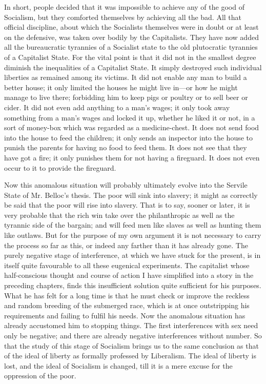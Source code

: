 \documentclass{book}
\begin{document}
In short, people decided that it was impossible to achieve any of the good of Socialism, but they comforted themselves by achieving all the bad. All that official discipline, about which the Socialists themselves were in doubt or at least on the defensive, was taken over bodily by the Capitalists. They have now added all the bureaucratic tyrannies of a Socialist state to the old plutocratic tyrannies of a Capitalist State. For the vital point is that it did not in the smallest degree diminish the inequalities of a Capitalist State. It simply destroyed such individual liberties as remained among its victims. It did not enable any man to build a better house; it only limited the houses he might live in—or how he might manage to live there; forbidding him to keep pigs or poultry or to sell beer or cider. It did not even add anything to a man’s wages; it only took away something from a man’s wages and locked it up, whether he liked it or not, in a sort of money-box which was regarded as a medicine-chest. It does not send food into the house to feed the children; it only sends an inspector into the house to punish the parents for having no food to feed them. It does not see that they have got a fire; it only punishes them for not having a fireguard. It does not even occur to it to provide the fireguard.

Now this anomalous situation will probably ultimately evolve into the Servile State of Mr. Belloc’s thesis. The poor will sink into slavery; it might as correctly be said that the poor will rise into slavery. That is to say, sooner or later, it is very probable that the rich win take over the philanthropic as well as the tyrannic side of the bargain; and will feed men like slaves as well as hunting them like outlaws. But for the purpose of my own argument it is not necessary to carry the process so far as this, or indeed any farther than it has already gone. The purely negative stage of interference, at which we have stuck for the present, is in itself quite favourable to all these eugenical experiments. The capitalist whose half-conscious thought and course of action I have simplified into a story in the preceding chapters, finds this insufficient solution quite sufficient for his purposes. What he has felt for a long time is that he must check or improve the reckless and random breeding of the submerged race, which is at once outstripping his requirements and failing to fulfil his needs. Now the anomalous situation has already accustomed him to stopping things. The first interferences with sex need only be negative; and there are already negative interferences without number. So that the study of this stage of Socialism brings us to the same conclusion as that of the ideal of liberty as formally professed by Liberalism. The ideal of liberty is lost, and the ideal of Socialism is changed, till it is a mere excuse for the oppression of the poor.
\end{document}
